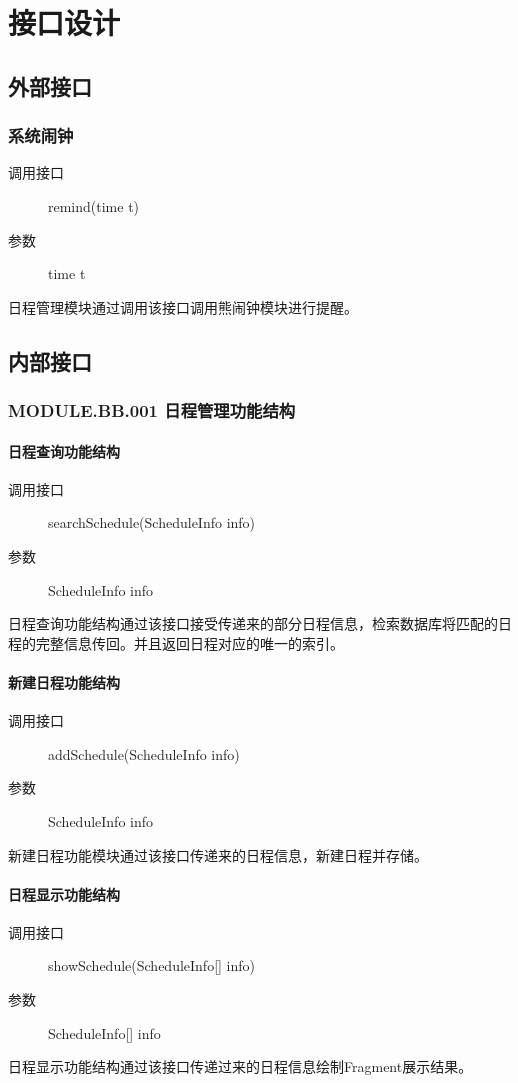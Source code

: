 \chapter{接口设计}
\section{外部接口}
\subsection{系统闹钟}
\begin{description}
  \item[调用接口]remind(time t)
  \item[参数]time t
\end{description}
日程管理模块通过调用该接口调用熊闹钟模块进行提醒。

\section{内部接口}
\subsection{MODULE.BB.001 日程管理功能结构}
  \subsubsection{日程查询功能结构}
  \begin{description}
    \item[调用接口]searchSchedule(ScheduleInfo info)
    \item[参数]ScheduleInfo info
  \end{description}
  日程查询功能结构通过该接口接受传递来的部分日程信息，检索数据库将匹配的日程的完整信息传回。并且返回日程对应的唯一的索引。
  \subsubsection{新建日程功能结构}
  \begin{description}
    \item[调用接口]addSchedule(ScheduleInfo info)
    \item[参数]ScheduleInfo info
  \end{description}
  新建日程功能模块通过该接口传递来的日程信息，新建日程并存储。
  \subsubsection{日程显示功能结构}
  \begin{description}
    \item[调用接口]showSchedule(ScheduleInfo[] info)
    \item[参数]ScheduleInfo[] info
  \end{description}
  日程显示功能结构通过该接口传递过来的日程信息绘制Fragment展示结果。

